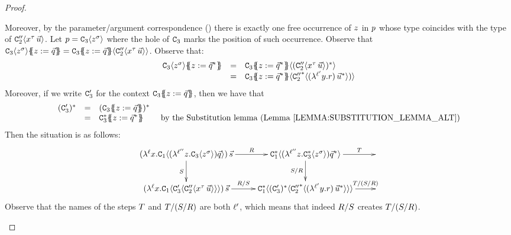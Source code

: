 \begin{proof}
\begin{enumerate}
\begin{enumerate}
\begin{enumerate}
\begin{itemize}
        Moreover, by the parameter/argument correspondence ()
        there is exactly one free occurrence of $z$ in $p$ whose type coincides with
        the type of $\mathtt{C}''_2\langle x^\tau\,\vec{u}\rangle$.
        Let $p = \mathtt{C}_3\langle z^{\sigma}\rangle$ where the hole of $\mathtt{C}_3$ marks the position
        of such occurrence.
        Observe that
        $\con_3\of{\varthree^{\typtwo}}\sub{\varthree}{\ls{\tmsix}} = \con_3\sub{\varthree}{\ls{\tmsix}}\of{\con''_2\of{\var^\typ\,\ls{\tmthree}}}$.
        Observe that:
        \[
          \begin{array}{rcl}
          \con_3\of{\varthree^{\typtwo}}\sub{\varthree}{\ls{\tmsix}^*}
          & = & \con_3\sub{\varthree}{\ls{\tmsix}^*}\of{(\con''_2\of{\var^\typ\,\ls{\tmthree}})^*} \\
          & = & \con_3\sub{\varthree}{\ls{\tmsix}^*}\of{{\con''_2}^*\of{(\lamp{\labtwo}{\vartwo}{\tmfour})\,\ls{\tmthree}^*})}
          \end{array}
        \]
        Moreover, if we write $\mathtt{C}'_3$ for the context $\mathtt{C}_3\{\!\!\{z := \vec{q}\}\!\!\}$,
        then we have that
        \[
          \begin{array}{rcll}
          (\con'_3)^*
          & = & (\con_3\sub{\varthree}{\ls{\tmsix}})^* \\
          & = & \con_3^*\sub{\varthree}{\ls{\tmsix}^*} & \text{ by the Substitution lemma~(\rlem{substitution_lemma_alt})}
          \end{array}
        \]
        Then the situation is as follows:
        \[
          \xymatrix{
            (\lamp{\lab}{\var}{\con_1\of{ (\lamp{\labthree}{\varthree}{\con_3\of{\varthree^\typtwo}})\ls{\tmsix} }})\,\ls{\tmtwo}
            \ar[r]^-{\redex}
            \ar[d]_-{\redextwo}
          &
            \con_1^*\of{ (\lamp{\labthree}{\varthree}{\con_3^*\of{\varthree^\typtwo}})\ls{\tmsix}^* }
            \ar[d]_-{\redextwo/\redex}
            \ar[r]^-{\redexthree}
          &
          \\
            (\lamp{\lab}{\var}{\con_1\of{ \con'_3\of{ \con''_2\of{\var^\typ\,\ls{\tmthree}} } }})\,\ls{\tmtwo}
            \ar[r]^-{\redex/\redextwo}
          &
            \con_1^*\of{ (\con'_3)^*\of{ {\con''_2}^*\of{(\lamp{\labtwo}{\vartwo}{\tmfour})\,\ls{\tmthree}^*} } }
            \ar[r]^-{\redexthree/(\redextwo/\redex)}
          &
          }
        \]
        Observe that the names of the steps $T$ and $T/(S/R)$ are both $\ell'$,
        which means that indeed $R/S$ creates $T/(S/R)$.

\end{itemize}
\end{enumerate}
\end{enumerate}
\end{enumerate}
\end{proof}
